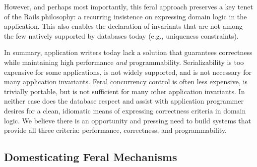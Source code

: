 \begin{impenumerate}
  However, and perhaps most importantly, this feral approach preserves
  a key tenet of the Rails philosophy: a recurring insistence on
  expressing domain logic in the application. This also enables the
  declaration of invariants that are not among the few natively
  supported by databases today (e.g., uniqueness constraints).
\end{impenumerate}

In summary, application writers today lack a solution that guarantees
correctness while maintaining high performance \textit{and}
programmability. Serializability is too expensive for some
applications, is not widely supported, and is not necessary for many
application invariants. Feral concurrency control is often less
expensive, is trivially portable, but is not sufficient for many other
application invariants. In neither case does the database respect and
assist with application programmer desires for a clean, idiomatic
means of expressing correctness criteria in domain logic. We believe
there is an opportunity and pressing need to build systems that
provide all three criteria: performance, correctness, and
programmability.

\subsection{Domesticating Feral Mechanisms}

